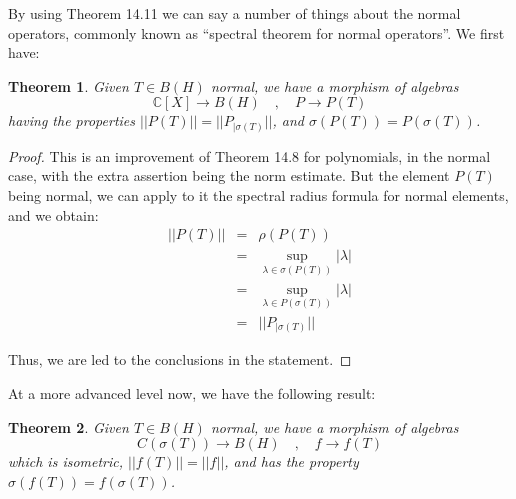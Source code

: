 \documentclass[12pt]{amsbook}
\newtheorem{theorem}{Theorem}[chapter]
\begin{document}
By using Theorem 14.11 we can say a number of things about the normal operators, commonly known as ``spectral theorem for normal operators''. We first have:

\begin{theorem}
Given $T\in B(H)$ normal, we have a morphism of algebras
$$\mathbb C[X]\to B(H)\quad,\quad 
P\to P(T)$$
having the properties $||P(T)||=||P_{|\sigma(T)}||$, and $\sigma(P(T))=P(\sigma(T))$.
\end{theorem}

\begin{proof}
This is an improvement of Theorem 14.8 for polynomials, in the normal case, with the extra assertion being the norm estimate. But the element $P(T)$ being normal, we can apply to it the spectral radius formula for normal elements, and we obtain:
\begin{eqnarray*}
||P(T)||
&=&\rho(P(T))\\
&=&\sup_{\lambda\in\sigma(P(T))}|\lambda|\\
&=&\sup_{\lambda\in P(\sigma(T))}|\lambda|\\
&=&||P_{|\sigma(T)}||
\end{eqnarray*}

Thus, we are led to the conclusions in the statement.
\end{proof}

At a more advanced level now, we have the following result:

\begin{theorem}
Given $T\in B(H)$ normal, we have a morphism of algebras
$$C(\sigma(T))\to B(H)\quad,\quad 
f\to f(T)$$
which is isometric, $||f(T)||=||f||$, and has the property $\sigma(f(T))=f(\sigma(T))$.
\end{theorem}
\end{document}
